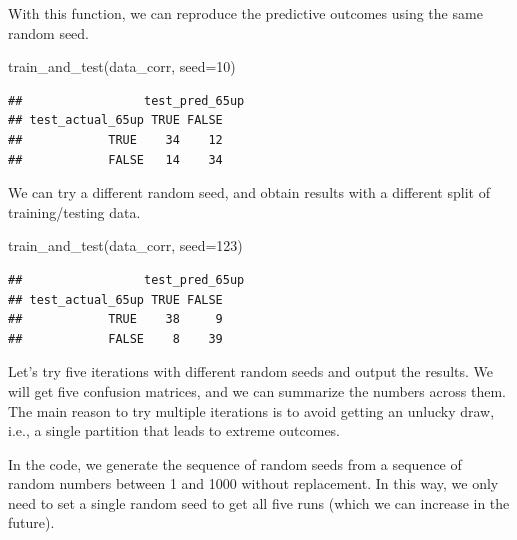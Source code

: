 \documentclass[
]{article}
\newenvironment{Shaded}{\begin{snugshade}}{\end{snugshade}}
\newcommand{\AttributeTok}[1]{\textcolor[rgb]{0.77,0.63,0.00}{#1}}
\newcommand{\DecValTok}[1]{\textcolor[rgb]{0.00,0.00,0.81}{#1}}
\newcommand{\FunctionTok}[1]{\textcolor[rgb]{0.00,0.00,0.00}{#1}}
\newcommand{\NormalTok}[1]{#1}
\begin{document}
With this function, we can reproduce the predictive outcomes using the
same random seed.

\begin{Shaded}
\begin{Highlighting}[]
\FunctionTok{train\_and\_test}\NormalTok{(data\_corr, }\AttributeTok{seed=}\DecValTok{10}\NormalTok{)}
\end{Highlighting}
\end{Shaded}

\begin{verbatim}
##                 test_pred_65up
## test_actual_65up TRUE FALSE
##            TRUE    34    12
##            FALSE   14    34
\end{verbatim}

We can try a different random seed, and obtain results with a different
split of training/testing data.

\begin{Shaded}
\begin{Highlighting}[]
\FunctionTok{train\_and\_test}\NormalTok{(data\_corr, }\AttributeTok{seed=}\DecValTok{123}\NormalTok{)}
\end{Highlighting}
\end{Shaded}

\begin{verbatim}
##                 test_pred_65up
## test_actual_65up TRUE FALSE
##            TRUE    38     9
##            FALSE    8    39
\end{verbatim}

Let's try five iterations with different random seeds and output the
results. We will get five confusion matrices, and we can summarize the
numbers across them. The main reason to try multiple iterations is to
avoid getting an unlucky draw, i.e., a single partition that leads to
extreme outcomes.

In the code, we generate the sequence of random seeds from a sequence of
random numbers between 1 and 1000 without replacement. In this way, we
only need to set a single random seed to get all five runs (which we can
increase in the future).
\end{document}
